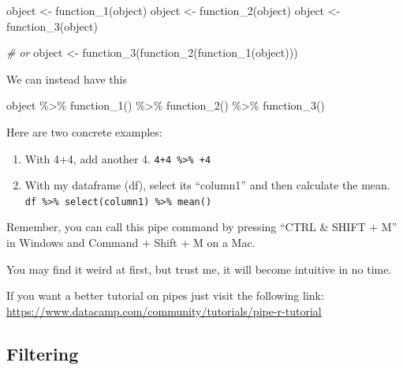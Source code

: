 \documentclass[
]{book}
\newenvironment{Shaded}{\begin{snugshade}}{\end{snugshade}}
\newcommand{\CommentTok}[1]{\textcolor[rgb]{0.56,0.35,0.01}{\textit{#1}}}
\newcommand{\FunctionTok}[1]{\textcolor[rgb]{0.00,0.00,0.00}{#1}}
\newcommand{\NormalTok}[1]{#1}
\newcommand{\OtherTok}[1]{\textcolor[rgb]{0.56,0.35,0.01}{#1}}
\newcommand{\SpecialCharTok}[1]{\textcolor[rgb]{0.00,0.00,0.00}{#1}}
\begin{document}
\begin{Shaded}
\begin{Highlighting}[]
\NormalTok{object }\OtherTok{\textless{}{-}} \FunctionTok{function\_1}\NormalTok{(object)}
\NormalTok{object }\OtherTok{\textless{}{-}} \FunctionTok{function\_2}\NormalTok{(object)}
\NormalTok{object }\OtherTok{\textless{}{-}} \FunctionTok{function\_3}\NormalTok{(object)}

\CommentTok{\# or}
\NormalTok{object }\OtherTok{\textless{}{-}} \FunctionTok{function\_3}\NormalTok{(}\FunctionTok{function\_2}\NormalTok{(}\FunctionTok{function\_1}\NormalTok{(object)))}
\end{Highlighting}
\end{Shaded}

We can instead have this

\begin{Shaded}
\begin{Highlighting}[]
\NormalTok{object }\SpecialCharTok{\%\textgreater{}\%} 
  \FunctionTok{function\_1}\NormalTok{() }\SpecialCharTok{\%\textgreater{}\%} 
  \FunctionTok{function\_2}\NormalTok{() }\SpecialCharTok{\%\textgreater{}\%} 
  \FunctionTok{function\_3}\NormalTok{()}
\end{Highlighting}
\end{Shaded}

Here are two concrete examples:

\begin{enumerate}
\def\labelenumi{\arabic{enumi}.}
\item
  With 4+4, add another 4.
  \texttt{4+4\ \%\textgreater{}\%\ +4}
\item
  With my dataframe (df), select its ``column1'' and then calculate the mean.
  \texttt{df\ \%\textgreater{}\%\ select(column1)\ \%\textgreater{}\%\ mean()}
\end{enumerate}

Remember, you can call this pipe command by pressing ``CTRL \& SHIFT + M'' in Windows and Command + Shift + M on a Mac.

You may find it weird at first, but trust me, it will become intuitive in no time.

If you want a better tutorial on pipes just visit the following link: \url{https://www.datacamp.com/community/tutorials/pipe-r-tutorial}

\hypertarget{filtering}{%
\subsection{Filtering}\label{filtering}}
\end{document}
